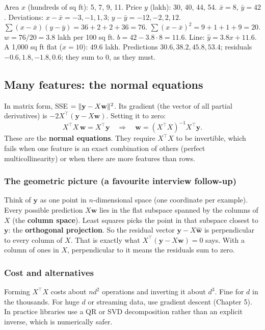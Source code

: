 \begin{example}
Area $x$ (hundreds of sq ft): 5, 7, 9, 11. Price $y$ (lakh): 30, 40, 44, 54.
$\bar x = 8$, $\bar y = 42$. Deviations: $x - \bar x = -3,-1,1,3$; $y-\bar y = -12,-2,2,12$.
$\sum(x-\bar x)(y-\bar y) = 36+2+2+36 = 76$. $\sum(x-\bar x)^2 = 9+1+1+9 = 20$.
$w = 76/20 = 3.8$ lakh per 100 sq ft. $b = 42 - 3.8\cdot8 = 11.6$.
Line: $\hat y = 3.8x + 11.6$. A 1{,}000 sq ft flat ($x=10$): $49.6$ lakh.
Predictions $30.6, 38.2, 45.8, 53.4$; residuals $-0.6, 1.8, -1.8, 0.6$; they sum to $0$, as they must.
\end{example}

\subsection{Many features: the normal equations}
In matrix form, SSE $= \lVert \mathbf y - X\mathbf w\rVert^2$. Its gradient (the vector of all partial derivatives)
is $-2X^\top(\mathbf y - X\mathbf w)$. Setting it to zero:
\[ X^\top X\,\mathbf w = X^\top\mathbf y \quad\Longrightarrow\quad \mathbf w = (X^\top X)^{-1}X^\top\mathbf y. \]
These are the \textbf{normal equations}. They require $X^\top X$ to be invertible, which fails when one
feature is an exact combination of others (perfect multicollinearity) or when there are more features than rows.

\subsubsection{The geometric picture (a favourite interview follow-up)}
Think of $\mathbf y$ as one point in $n$-dimensional space (one coordinate per example). Every possible
prediction $X\mathbf w$ lies in the flat subspace spanned by the columns of $X$ (the \textbf{column space}).
Least squares picks the point in that subspace closest to $\mathbf y$: the \textbf{orthogonal projection}. So
the residual vector $\mathbf y - X\hat{\mathbf w}$ is perpendicular to every column of $X$. That is exactly what
$X^\top(\mathbf y - X\mathbf w) = 0$ says. With a column of ones in $X$, perpendicular to it means the residuals
sum to zero.

\subsubsection{Cost and alternatives}
Forming $X^\top X$ costs about $nd^2$ operations and inverting it about $d^3$. Fine for $d$ in the thousands.
For huge $d$ or streaming data, use gradient descent (Chapter 5). In practice libraries use a QR or SVD
decomposition rather than an explicit inverse, which is numerically safer.


